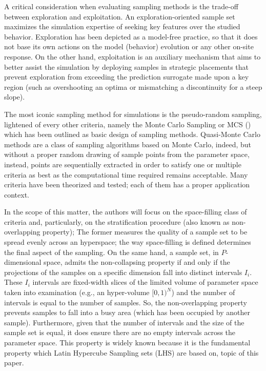 \documentclass[12pt]{extarticle}
\begin{document}
A critical consideration when evaluating sampling methods is the trade-off between exploration and exploitation. An exploration-oriented sample set maximizes the simulation expertise of seeking key features over the studied behavior. Exploration has been depicted as a model-free practice, so that it does not base its own actions on the model (behavior) evolution or any other on-site response. On the other hand, exploitation is an auxiliary mechanism that aims to better assist the simulation by deploying samples in strategic placements that prevent exploration from exceeding the prediction surrogate made upon a key region (such as overshooting an optima or mismatching a discontinuity for a steep slope).

The most iconic sampling method for simulations is the pseudo-random sampling, lightened of every other criteria, namely the Monte Carlo Sampling or MCS ()  which has been outlined as basic design of sampling methods. Quasi-Monte Carlo methods are a class of sampling algorithms based on Monte Carlo, indeed, but without a proper random drawing of sample points from the parameter space, instead, points are sequentially extracted in order to satisfy one or multiple criteria as best as the computational time required remains acceptable. Many criteria have been theorized and tested; each of them has a proper application context.

In the scope of this matter, the authors will focus on the space-filling class of criteria and, particularly, on the stratification procedure (also known as non-overlapping property); The former measures the quality of a sample set to be spread evenly across an hyperspace; the way space-filling is defined determines the final aspect of the sampling. On the same hand, a sample set, in $P$-dimensional space, admits the non-collapsing property if and only if the projections of the samples on a specific dimension fall into distinct intervals $I_i$. These $I_i$ intervals are fixed-width slices of the limited volume of parameter space taken into examination (e.g., an hyper-volume $[0,1)^N$) and the number of intervals is equal to the number of samples. So, the non-overlapping property prevents samples to fall into a busy area (which has been occupied by another sample). Furthermore, given that the number of intervals and the size of the sample set is equal, it does ensure there are no empty intervals across the parameter space. This property is widely known because it is the fundamental property which Latin Hypercube Sampling sets (LHS) are based on, topic of this paper.
\end{document}
